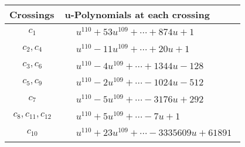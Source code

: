 \documentclass[1p]{elsarticle_modified}
\theoremstyle{definition}
\begin{document}
\begin{tabular}{m{50pt}|m{274pt}}
Crossings & \hspace{64pt}u-Polynomials at each crossing \\
\hline $$\begin{aligned}c_{1}\end{aligned}$$&$\begin{aligned}
&u^{110}+53 u^{109}+\cdots+874 u+1
\end{aligned}$\\
\hline $$\begin{aligned}c_{2},c_{4}\end{aligned}$$&$\begin{aligned}
&u^{110}-11 u^{109}+\cdots+20 u+1
\end{aligned}$\\
\hline $$\begin{aligned}c_{3},c_{6}\end{aligned}$$&$\begin{aligned}
&u^{110}-4 u^{109}+\cdots+1344 u-128
\end{aligned}$\\
\hline $$\begin{aligned}c_{5},c_{9}\end{aligned}$$&$\begin{aligned}
&u^{110}-2 u^{109}+\cdots-1024 u-512
\end{aligned}$\\
\hline $$\begin{aligned}c_{7}\end{aligned}$$&$\begin{aligned}
&u^{110}-5 u^{109}+\cdots-3176 u+292
\end{aligned}$\\
\hline $$\begin{aligned}c_{8},c_{11},c_{12}\end{aligned}$$&$\begin{aligned}
&u^{110}+5 u^{109}+\cdots-7 u+1
\end{aligned}$\\
\hline $$\begin{aligned}c_{10}\end{aligned}$$&$\begin{aligned}
&u^{110}+23 u^{109}+\cdots-3335609 u+61891
\end{aligned}$\\
\hline
\end{tabular}\\~\\
\end{document}
